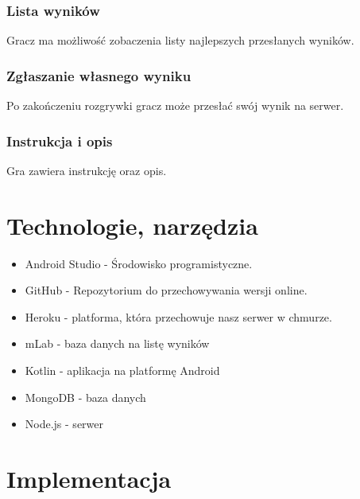 \documentclass[12pt,a4paper]{article}
\begin{document}
			\subsubsection{Lista wyników}
			Gracz ma możliwość zobaczenia listy najlepszych przesłanych wyników.
			\subsubsection{Zgłaszanie własnego wyniku}
			Po zakończeniu rozgrywki gracz może przesłać swój wynik na serwer.
			\subsubsection{Instrukcja i opis}
			Gra zawiera instrukcję oraz opis.
	\section{Technologie, narzędzia}
			\begin{itemize}
			\item Android Studio - Środowisko programistyczne.
			\item GitHub - Repozytorium do przechowywania wersji online.
			\item Heroku - platforma, która przechowuje nasz serwer w chmurze.
			\item mLab - baza danych na listę wyników
			\item Kotlin - aplikacja na platformę Android
			\item MongoDB - baza danych
			\item Node.js - serwer
			\end{itemize}
			\clearpage
	\section{Implementacja}
\end{document}

